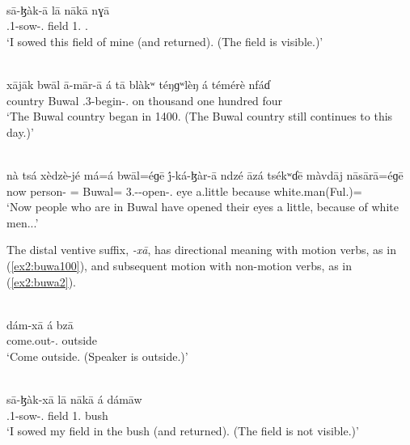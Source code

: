 \ea\label{ex2:buwa7}
 \\
\gll   sā-ɮàk-ā lā nākā nɣā	 \\
.1-sow-. field 1. .		\\
\glt `I sowed this field of mine (and returned). (The field is visible.)'

\ex\label{ex2:buwa8}
 \\
\gll xājāk bwāl ā-mār-ā á tā blàkʷ téŋɡʷlèŋ á témérè nfáɗ	\\
country Buwal .3-begin-.  on thousand one  hundred four	\\
\glt `The Buwal country began in 1400. (The Buwal country still continues to this day.)'

\ex\label{ex2:buwa9}
 \\
\gll nà tsá xèdzè-jé má=á bwāl=éɡē j́-ká-ɮàr-ā ndzé āzá tsékʷɗē màvdāj nāsārā=éɡē	\\
now  person- = Buwal= 3.--open-. eye  a.little because white.man(Ful.)=		\\
\glt `Now people who are in Buwal have opened their eyes a little, because of white men...'
\z 

The distal ventive suffix, \textit{-xā}, has directional meaning with motion verbs, as in (\ref{ex2:buwa100}), and subsequent motion with non-motion verbs, as in (\ref{ex2:buwa2}). 

\ea\label{ex2:buwa100}
 \\
\gll   dám-xā á bzā	\\
come.out-.  outside		\\
\glt `Come outside. (Speaker is outside.)'

\ex\label{ex2:buwa2}
 \\
\gll  sā-ɮàk-xā	lā	nākā	á	dámāw \\
.1-sow-.	field	1.		bush \\
\glt `I sowed my field in the bush (and returned). (The field is not visible.)'
\z 

